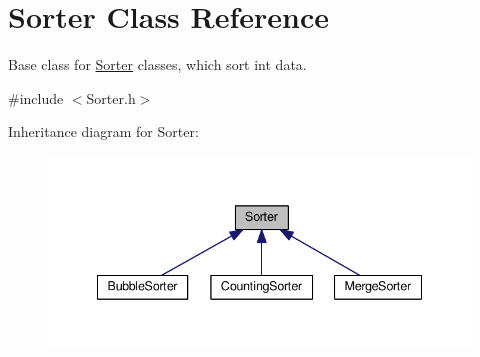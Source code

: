 \hypertarget{class_sorter}{}\section{Sorter Class Reference}
\label{class_sorter}


Base class for \hyperlink{class_sorter}{Sorter} classes, which sort int data.  




{\ttfamily \#include $<$Sorter.\+h$>$}



Inheritance diagram for Sorter\+:\nopagebreak
\begin{figure}[H]
\begin{center}
\leavevmode
\includegraphics[width=342pt]{class_sorter__inherit__graph}
\end{center}
\end{figure}
